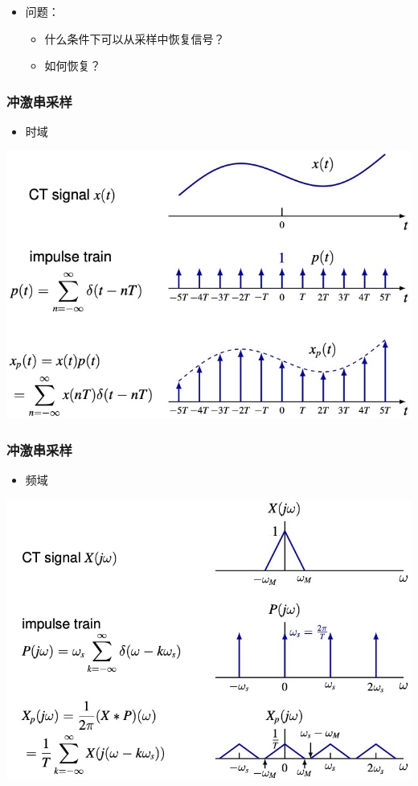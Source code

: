 \documentclass[CJKutf8,dvipsnames,table]{beamer}
\begin{document}
\begin{CJK*}{UTF8}{song}
\begin{frame}
\begin{itemize}
	\item 问题：
		\begin{itemize}
		\item 什么条件下可以从采样中恢复信号？
		\item 如何恢复？
		\end{itemize}
    \end{itemize}
  \end{frame}   
     
  \begin{frame}
    \frametitle{冲激串采样}
    \begin{itemize}
    \item 时域
    \end{itemize}
    \begin{center}
      \includegraphics[scale=.4]{impulse-train-sampling-time}
    \end{center}
  \end{frame}  
  
  \begin{frame}
    \frametitle{冲激串采样}
    \begin{itemize}
    \item 频域
    \end{itemize}
    \begin{center}
      \includegraphics[scale=.4]{impulse-train-sampling-freq}
    \end{center}
  \end{frame}        


\end{CJK*}
\end{document}
